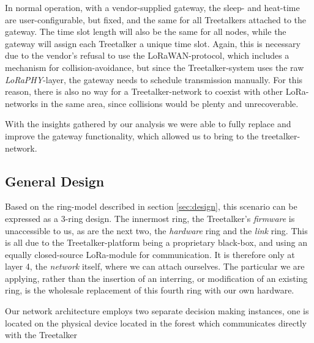 In normal operation, with a vendor-supplied gateway, the sleep- and heat-time are user-configurable, but fixed, and the same for all Treetalkers attached to the gateway.
The time slot length will also be the same for all nodes, while the gateway will assign each Treetalker a unique time slot.
Again, this is necessary due to the vendor's refusal to use the LoRaWAN-protocol, which includes a mechanism for collision-avoidance, but since the Treetalker-system uses the raw \textit{LoRaPHY}-layer, the gateway needs to schedule transmission manually.
For this reason, there is also no way for a Treetalker-network to coexist with other LoRa-networks in the same area, since collisions would be plenty and unrecoverable.

With the insights gathered by our analysis we were able to fully replace and improve the gateway functionality, which allowed us to bring \mm to the treetalker-network.

\subsection{General Design}
\label{sec:treetalker:design}

Based on the ring-model described in section \ref{sec:design}, this scenario can be expressed as a 3-ring design.
The innermost ring, the Treetalker's \textit{firmware} is unaccessible to us, as are the next two, the \textit{hardware} ring and the \textit{link} ring.
This is all due to the Treetalker-platform being a proprietary black-box, and using an equally closed-source LoRa-module for communication.
It is therefore only at layer 4, the \textit{network} itself, where we can attach ourselves.
The particular \mm we are applying, rather than the insertion of an interring, or modification of an existing ring, is the wholesale replacement of this fourth ring with our own hardware.

Our network architecture employs two separate decision making instances, one is located on the physical device located in the forest which communicates directly with the Treetalker
